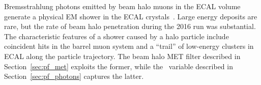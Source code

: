 Bremsstrahlung photons emitted by beam halo muons in the ECAL volume generate a physical EM shower in the ECAL crystals~\cite{Halo2015}. 
Large energy deposits are rare, but the rate of beam halo penetration during the 2016 run was substantial.
The characteristic features of a shower caused by a halo particle include coincident hits in the barrel muon system and a ``trail'' of low-energy clusters in ECAL along the particle trajectory. 
The beam halo MET filter described in Section~\ref{sec:pf_met} exploits the former, while the \emip\ variable described in Section~\ref{sec:pf_photons} captures the latter.

